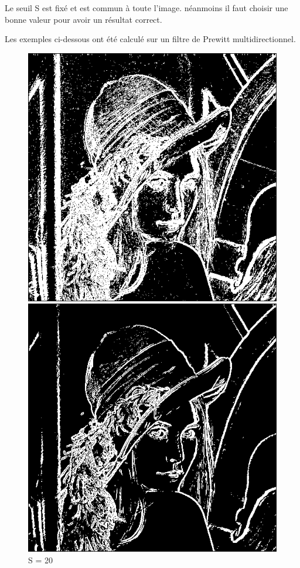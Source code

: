 \documentclass[11pt]{article}
\begin{document}
	Le seuil S est fixé et est commun à toute l'image. néanmoins il faut choisir une bonne valeur pour avoir un résultat correct.

	Les exemples ci-dessous ont été calculé sur un filtre de Prewitt multidirectionnel.
	\begin{figure}[H]
		\begin{minipage}[c]{.30\linewidth}
			\centering
			\includegraphics[scale=0.15]{Image/seuilFixe20.png}
			\caption{S = 20}
			\label{fig:seuilFixe20}
		\end{minipage} \hfill
		\begin{minipage}[c]{.30\linewidth}
			\centering
			\includegraphics[scale=0.15]{Image/seuilFixe50.png}

\end{minipage}
\end{figure}
\end{document}
